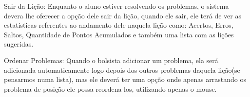 \begin{alineascomponto}
	\item Sair da Lição: Enquanto o aluno estiver resolvendo os problemas, o 
sistema devera lhe oferecer a opção dele sair da lição, quando ele sair, ele 
terá de ver as estatísticas referentes ao andamento dele naquela lição como: 
Acertos, Erros, Saltos, Quantidade de Pontos Acumulados e também uma lista com 
as lições sugeridas.
	
	\item Ordenar Problemas: Quando o bolsista adicionar um problema, ela será 
adicionada automaticamente logo depois dos outros problemas daquela lição(se 
pensarmos numa lista), mas ele deverá ter uma opção onde apenas arrastando 
os problema de posição ele possa reordena-los, utilizando apenas o mouse.

\end{alineascomponto}